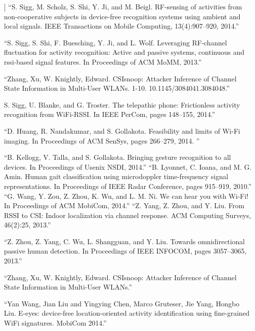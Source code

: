 \documentclass[conference]{IEEEtran}
\begin{document}
\begin{thebibliography}{99}
] “S. Sigg, M. Scholz, S. Shi, Y. Ji, and M. Beigl. RF-sensing of activities from non-cooperative subjects in device-free recognition systems using ambient and local signals. IEEE Transactions on Mobile Computing, 13(4):907–920, 2014.”

 “S. Sigg, S. Shi, F. Buesching, Y. Ji, and L. Wolf. Leveraging RF-channel fluctuation for activity recognition: Active and passive systems, continuous and rssi-based signal features. In Proceedings of ACM MoMM, 2013.”

 “Zhang, Xu, W. Knightly, Edward. CSIsnoop: Attacker Inference of Channel State Information in Multi-User WLANs. 1-10. 10.1145/3084041.3084048.”


 S. Sigg, U. Blanke, and G. Troster. The telepathic phone: Frictionless activity recognition from WiFi-RSSI. In IEEE PerCom, pages 148–155, 2014.”

 “D. Huang, R. Nandakumar, and S. Gollakota. Feasibility and limits of Wi-Fi imaging. In Proceedings of ACM SenSys, pages 266–279, 2014. ”

 “B. Kellogg, V. Talla, and S. Gollakota. Bringing gesture recognition to all devices. In Proceedings of Usenix NSDI, 2014.”
“B. Lyonnet, C. Ioana, and M. G. Amin. Human gait classification using microdoppler time-frequency signal representations. In Proceedings of IEEE Radar Conference, pages 915–919, 2010.”
 “G. Wang, Y. Zou, Z. Zhou, K. Wu, and L. M. Ni. We can hear you with Wi-Fi! In Proceedings of ACM MobiCom, 2014.”
 “Z. Yang, Z. Zhou, and Y. Liu. From RSSI to CSI: Indoor localization via channel response. ACM Computing Surveys, 46(2):25, 2013.”

 “Z. Zhou, Z. Yang, C. Wu, L. Shangguan, and Y. Liu. Towards omnidirectional passive human detection. In Proceedings of IEEE INFOCOM, pages 3057–3065, 2013.”

 “Zhang, Xu, W. Knightly, Edward. CSIsnoop: Attacker Inference of Channel State Information in Multi-User WLANs.”

 “Yan Wang, Jian Liu and Yingying Chen, Marco Gruteser, Jie Yang, Hongbo Liu. E-eyes: device-free location-oriented activity identification using fine-grained WiFi signatures. MobiCom 2014.”



\end{thebibliography}
\end{document}
